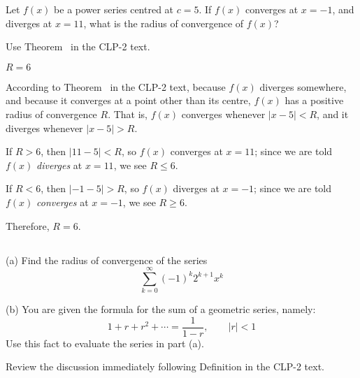 \begin{Mquestion}
	Let $f(x)$ be a power series centred at $c=5$. If $f(x)$ converges at $x=-1$, and diverges at $x=11$, what is the radius of convergence of $f(x)$?
\end{Mquestion}
\begin{hint}
	Use Theorem~ in the CLP-2 text.
\end{hint}
\begin{answer}
	$R=6$
\end{answer}
\begin{solution}
	According to Theorem~ in the CLP-2 text, because $f(x)$ diverges somewhere, and because it converges at a point other than its centre,  $f(x)$ has a positive radius of convergence $R$. That is, $f(x)$ converges whenever $|x-5|<R$, and it diverges whenever $|x-5|>R$.

	If $R>6$, then $|11-5|<R$, so $f(x)$ converges at $x=11$; since we are told $f(x)$ \emph{diverges} at $x=11$, we see $R \le 6$.

	If $R<6$, then $|-1-5|>R$, so $f(x)$ diverges at $x=-1$; since we are told $f(x)$ \emph{converges} at $x=-1$, we see $R \ge 6$.

	Therefore, $R=6$.
\end{solution}









\subsection*{\Procedural}

\begin{Mquestion}[M105 2012A]
(a) Find the radius of convergence of the series
\begin{equation*}
\sum_{k=0}^\infty (-1)^k 2^{k+1} x^k
\end{equation*}

\noindent (b)
You are given the formula for the sum of a geometric series, namely:
\begin{equation*}
1+r+r^2 + \cdots =\frac{1}{1-r},\qquad|r|<1
\end{equation*}
Use this fact to evaluate the series in part (a).
\end{Mquestion}

\begin{hint}
Review the discussion immediately following Definition
 in the
CLP-2 text.
\end{hint}

